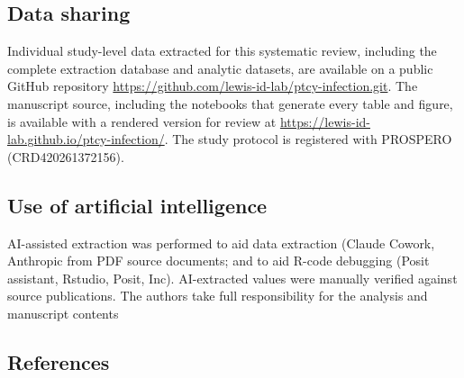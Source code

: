 \documentclass[
  british,
  8.6pt,
  a4paper,
  twocolumn]{article}
\begin{document}
\subsection{Data sharing}\label{data-sharing}

Individual study-level data extracted for this systematic review,
including the complete extraction database and analytic datasets, are
available on a public GitHub repository
\url{https://github.com/lewis-id-lab/ptcy-infection.git}. The manuscript
source, including the notebooks that generate every table and figure, is
available with a rendered version for review at
\url{https://lewis-id-lab.github.io/ptcy-infection/}. The study protocol
is registered with PROSPERO (CRD420261372156).

\subsection{Use of artificial
intelligence}\label{use-of-artificial-intelligence}

AI-assisted extraction was performed to aid data extraction (Claude
Cowork, Anthropic from PDF source documents; and to aid R-code debugging
(Posit assistant, Rstudio, Posit, Inc). AI-extracted values were
manually verified against source publications. The authors take full
responsibility for the analysis and manuscript contents

\subsection{References}\label{references}
\end{document}
